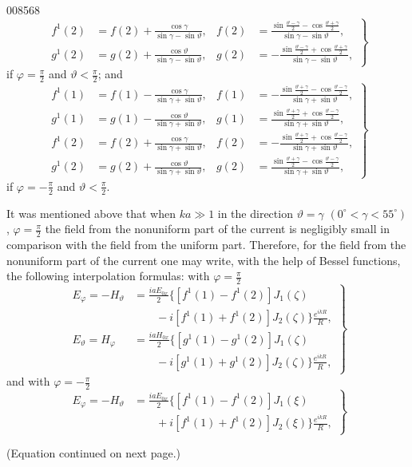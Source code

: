 \begin{scanpage}{0085}{68}
\[
\left.\begin{aligned}
f^1(2)&=f(2)+\frac{\cos\gamma}{\sin\gamma-\sin\vartheta},&
f(2)&=\frac{\sin\frac{\vartheta-\gamma}2-\cos\frac{\vartheta+\gamma}2}{\sin\gamma-\sin\vartheta},\\
g^1(2)&=g(2)+\frac{\cos\vartheta}{\sin\gamma-\sin\vartheta},&
g(2)&=-\frac{\sin\frac{\vartheta-\gamma}2+\cos\frac{\vartheta+\gamma}2}{\sin\gamma-\sin\vartheta},
\end{aligned}\right\}\tag{12.03}
\]
if $\varphi=\frac\pi2$ and $\vartheta<\frac\pi2$; and
\[
\left.\begin{aligned}
f^1(1)&=f(1)-\frac{\cos\gamma}{\sin\gamma+\sin\vartheta},&
f(1)&=-\frac{\sin\frac{\vartheta+\gamma}2-\cos\frac{\vartheta-\gamma}2}{\sin\gamma+\sin\vartheta},\\
g^1(1)&=g(1)-\frac{\cos\vartheta}{\sin\gamma+\sin\vartheta},&
g(1)&=\frac{\sin\frac{\vartheta+\gamma}2+\cos\frac{\vartheta-\gamma}2}{\sin\gamma+\sin\vartheta},\\
f^1(2)&=f(2)+\frac{\cos\gamma}{\sin\gamma+\sin\vartheta},&
f(2)&=-\frac{\sin\frac{\vartheta+\gamma}2+\cos\frac{\vartheta-\gamma}2}{\sin\gamma+\sin\vartheta},\\
g^1(2)&=g(2)+\frac{\cos\vartheta}{\sin\gamma+\sin\vartheta},&
g(2)&=\frac{\sin\frac{\vartheta+\gamma}2-\cos\frac{\vartheta-\gamma}2}{\sin\gamma+\sin\vartheta},
\end{aligned}\right\}\tag{12.04}
\]
if $\varphi=-\frac\pi2$ and $\vartheta<\frac\pi2$.

It was mentioned above that when $ka\gg1$ in the direction $\vartheta=\gamma$ $(0^\circ<\gamma<55^\circ)$, $\varphi=\frac\pi2$ the field from the nonuniform part of the current is negligibly small in comparison with the field from the uniform part. Therefore, for the field from the nonuniform part of the current one may write, with the help of Bessel functions, the following interpolation formulas: with $\varphi=\frac\pi2$
\[
\left.\begin{aligned}
E_\varphi=-H_\vartheta&=\frac{iaE_{0x}}2\{[f^1(1)-f^1(2)]J_1(\zeta)\\
&\qquad-i[f^1(1)+f^1(2)]J_2(\zeta)\}\frac{e^{ikR}}R,\\
E_\vartheta=H_\varphi&=\frac{iaH_{0x}}2\{[g^1(1)-g^1(2)]J_1(\zeta)\\
&\qquad-i[g^1(1)+g^1(2)]J_2(\zeta)\}\frac{e^{ikR}}R,
\end{aligned}\right\}\tag{12.05}
\]
and with $\varphi=-\frac\pi2$
\[
\left.\begin{aligned}
E_\varphi=-H_\vartheta&=\frac{iaE_{0x}}2\{[f^1(1)-f^1(2)]J_1(\xi)\\
&\qquad+i[f^1(1)+f^1(2)]J_2(\xi)\}\frac{e^{ikR}}R,
\end{aligned}\right\}\tag{12.06}
\]
\begin{center}(Equation continued on next page.)\end{center}
\end{scanpage}

